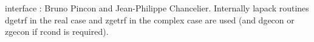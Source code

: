 \begin{manseealso}
\end{manseealso}

\begin{authors}
   interface : Bruno Pincon and Jean-Philippe Chancelier. Internally lapack routines dgetrf in the
   real case and zgetrf in the complex case are used (and dgecon or zgecon if
   rcond is required).
\end{authors}
